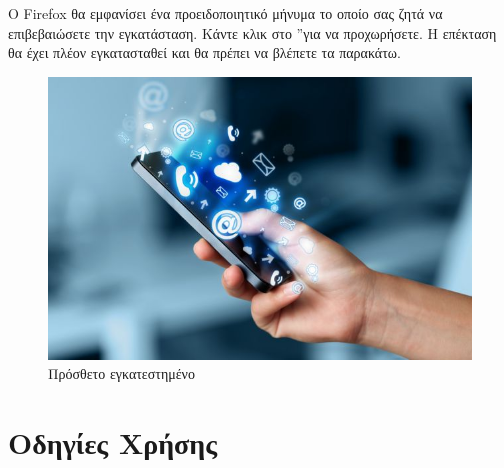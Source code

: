 \documentclass{article}
\begin{document}
Ο Firefox θα εμφανίσει ένα προειδοποιητικό μήνυμα το οποίο σας ζητά να επιβεβαιώσετε την εγκατάσταση. Κάντε κλικ στο \textquotedblright για να προχωρήσετε. Η επέκταση θα έχει πλέον εγκατασταθεί και θα πρέπει να βλέπετε τα παρακάτω.

\begin{figure}[H]
    \includegraphics[width=\textwidth]{logo}
    \caption*{Πρόσθετο εγκατεστημένο}
\end{figure}

\section*{Οδηγίες Χρήσης}
\end{document}
